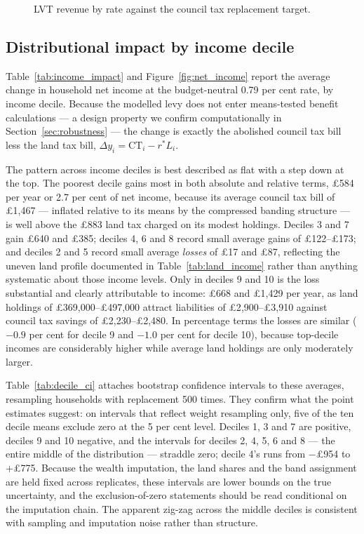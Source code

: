 \begin{figure}[htbp]
\centering
{}
\caption{LVT revenue by rate against the council tax replacement target.}
\label{fig:revenue}
\end{figure}

\subsection{Distributional impact by income decile}
\label{sec:income_impact}

Table~\ref{tab:income_impact} and Figure~\ref{fig:net_income} report the average change in household net income at the budget-neutral 0.79 per cent rate, by income decile. Because the modelled levy does not enter means-tested benefit calculations --- a design property we confirm computationally in Section~\ref{sec:robustness} --- the change is exactly the abolished council tax bill less the land tax bill, $\Delta y_i = \mathrm{CT}_i - r^{*}L_i$.

The pattern across income deciles is best described as flat with a step down at the top. The poorest decile gains most in both absolute and relative terms, \pounds 584 per year or 2.7 per cent of net income, because its average council tax bill of \pounds 1{,}467 --- inflated relative to its means by the compressed banding structure --- is well above the \pounds 883 land tax charged on its modest holdings. Deciles 3 and 7 gain \pounds 640 and \pounds 385; deciles 4, 6 and 8 record small average gains of \pounds 122--\pounds 173; and deciles 2 and 5 record small average \emph{losses} of \pounds 17 and \pounds 87, reflecting the uneven land profile documented in Table~\ref{tab:land_income} rather than anything systematic about those income levels. Only in deciles 9 and 10 is the loss substantial and clearly attributable to income: \pounds 668 and \pounds 1{,}429 per year, as land holdings of \pounds 369{,}000--\pounds 497{,}000 attract liabilities of \pounds 2{,}900--\pounds 3{,}910 against council tax savings of \pounds 2{,}230--\pounds 2{,}480. In percentage terms the losses are similar ($-0.9$ per cent for decile 9 and $-1.0$ per cent for decile 10), because top-decile incomes are considerably higher while average land holdings are only moderately larger.

Table~\ref{tab:decile_ci} attaches bootstrap confidence intervals to these averages, resampling households with replacement 500 times. They confirm what the point estimates suggest: on intervals that reflect weight resampling only, five of the ten decile means exclude zero at the 5 per cent level. Deciles 1, 3 and 7 are positive, deciles 9 and 10 negative, and the intervals for deciles 2, 4, 5, 6 and 8 --- the entire middle of the distribution --- straddle zero; decile 4's runs from $-$\pounds 954 to $+$\pounds 775. Because the wealth imputation, the land shares and the band assignment are held fixed across replicates, these intervals are lower bounds on the true uncertainty, and the exclusion-of-zero statements should be read conditional on the imputation chain. The apparent zig-zag across the middle deciles is consistent with sampling and imputation noise rather than structure.

